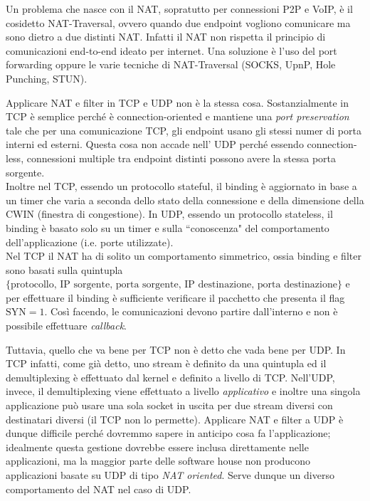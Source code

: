 Un problema che nasce con il NAT, sopratutto per connessioni P2P e VoIP, è il cosidetto NAT-Traversal, ovvero quando due endpoint vogliono comunicare ma sono dietro a due distinti NAT. Infatti il NAT non rispetta il principio di comunicazioni end-to-end ideato per internet. Una soluzione è l'uso del port forwarding oppure le varie tecniche di NAT-Traversal (SOCKS, UpnP, Hole Punching, STUN). 

Applicare NAT e filter in TCP e UDP non è la stessa cosa. Sostanzialmente in TCP è semplice perché è connection-oriented e mantiene una \textit{port preservation} tale che per una comunicazione TCP, gli endpoint usano gli stessi numer di porta interni ed esterni. Questa cosa non accade nell' UDP perché essendo connection-less, connessioni multiple tra endpoint distinti possono avere la stessa porta sorgente. \\
Inoltre nel TCP, essendo un protocollo stateful, il binding è aggiornato in base a un timer che varia a seconda dello stato della connessione e della dimensione della CWIN (finestra di congestione). In UDP, essendo un protocollo stateless, il binding è basato solo su un timer e sulla \textquotedblleft conoscenza" del comportamento dell'applicazione (i.e. porte utilizzate).\\
Nel TCP il NAT ha di solito un comportamento simmetrico, ossia binding e filter sono basati sulla quintupla $\{\text{protocollo, IP sorgente, porta sorgente, IP destinazione, porta destinazione}\}$ e per effettuare il binding è sufficiente verificare il pacchetto che presenta il flag $\text{SYN} = 1$. Così facendo, le comunicazioni devono partire dall'interno e non è possibile effettuare \textit{callback}.

Tuttavia, quello che va bene per TCP non è detto che vada bene per UDP. In TCP infatti, come già detto, uno stream è definito da una quintupla ed il demultiplexing è effettuato dal kernel e definito a livello di TCP. Nell'UDP, invece, il demultiplexing viene effettuato a livello \textit{applicativo} e inoltre una singola applicazione può usare una sola socket in uscita per due stream diversi con destinatari diversi (il TCP non lo permette). Applicare NAT e filter a UDP è dunque difficile perché dovremmo sapere in anticipo cosa fa l'applicazione; idealmente questa gestione dovrebbe essere inclusa direttamente nelle applicazioni, ma la maggior parte delle software house non producono applicazioni basate su UDP di tipo \textit{NAT oriented}. Serve dunque un diverso comportamento del NAT nel caso di UDP.

